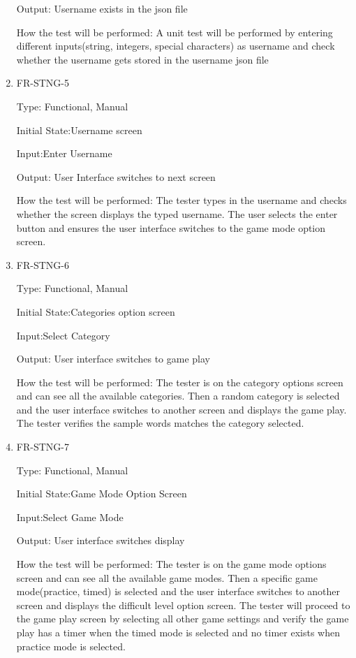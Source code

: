 \documentclass[12pt, titlepage]{article}
\begin{document}
\begin{enumerate}
Output: Username exists in the json file

How the test will be performed: A unit test will be performed by entering different inputs(string, integers, special characters) as username and check whether the username gets stored in the username json file

\item{FR-STNG-5\\}

Type: Functional, Manual

Initial State:Username screen

Input:Enter Username

Output: User Interface switches to next screen

How the test will be performed: The tester types in the username and checks whether the screen displays the typed username. The user selects the enter button and ensures the user interface switches to the game mode option screen. 

\item{FR-STNG-6\\}

Type: Functional, Manual

Initial State:Categories option screen

Input:Select Category

Output: User interface switches to game play

How the test will be performed: The tester is on the category options screen and can see all the available categories. Then a random category is selected and the user interface switches to another screen and displays the game play. The tester verifies the sample words matches the category selected. 

\item{FR-STNG-7\\}

Type: Functional, Manual

Initial State:Game Mode Option Screen

Input:Select Game Mode

Output: User interface switches display 

How the test will be performed: The tester is on the game mode options screen and can see all the available game modes. Then a specific game mode(practice, timed) is selected and the user interface switches to another screen and displays the difficult level option screen. The tester will proceed to the game play screen by selecting all other game settings and verify the game play has a timer when the timed mode is selected and no timer exists when practice mode is selected.

\end{enumerate}
\end{document}
